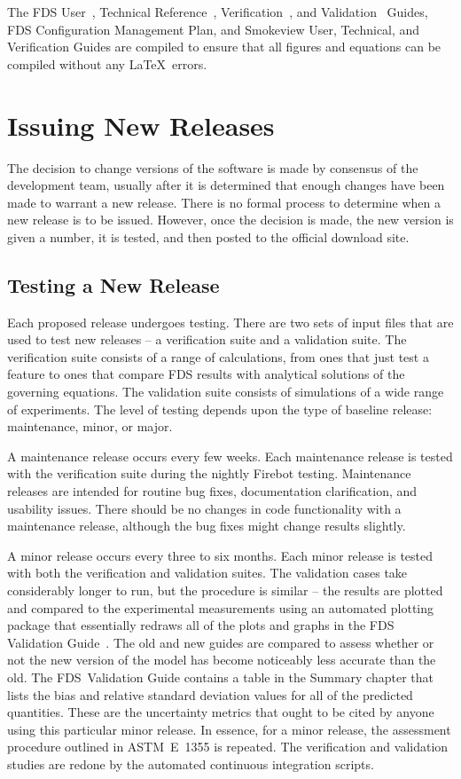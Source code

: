 \documentclass[11pt]{book}
\begin{document}
The FDS User~\cite{FDS_Users_Guide}, Technical Reference~\cite{FDS_Math_Guide}, Verification~\cite{FDS_Verification_Guide}, and Validation~\cite{FDS_Validation_Guide} Guides, FDS Configuration Management Plan, and Smokeview User, Technical, and Verification Guides are compiled to ensure that all figures and equations can be compiled without any \LaTeX\ errors.


\section{Issuing New Releases}

The decision to change versions of the software is made by consensus of the development team, usually after it is determined that enough changes have been made to warrant a new release. There is no formal process to determine when a new release is to be issued. However, once the decision is made, the new version is given a number, it is tested, and then posted to the official download site.


\subsection{Testing a New Release}

Each proposed release undergoes testing. There are two sets of input files that are used to test new releases -- a verification suite and a validation suite. The verification suite consists of a range of calculations, from ones that just test a feature to ones that compare FDS results with analytical solutions of the governing equations. The validation suite consists of simulations of a wide range of experiments. The level of testing depends upon the type of baseline release: maintenance, minor, or major.

A maintenance release occurs every few weeks. Each maintenance release is tested with the verification suite during the nightly Firebot testing. Maintenance releases are intended for routine bug fixes, documentation clarification, and usability issues. There should be no changes in code functionality with a maintenance release, although the bug fixes might change results slightly.

A minor release occurs every three to six months. Each minor release is tested with both the verification and validation suites. The validation cases take considerably longer to run, but the procedure is similar -- the results are plotted and compared to the experimental measurements using an automated plotting package that essentially redraws all of the plots and graphs in the FDS Validation Guide~\cite{FDS_Validation_Guide}. The old and new guides are compared to assess whether or not the new version of the model has become noticeably less accurate than the old. The FDS~Validation Guide contains a table in the Summary chapter that lists the bias and relative standard deviation values for all of the predicted quantities. These are the uncertainty metrics that ought to be cited by anyone using this particular minor release. In essence, for a minor release, the assessment procedure outlined in ASTM~E~1355 is repeated. The verification and validation studies are redone by the automated continuous integration scripts.
\end{document}
